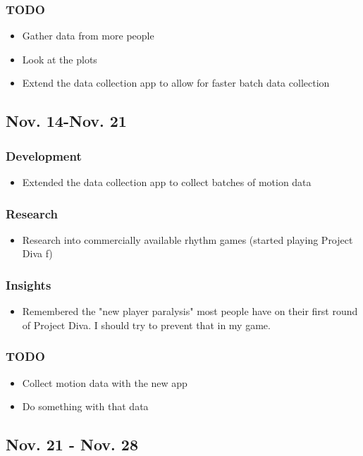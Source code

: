 \documentclass{article}
\begin{document}
\subsubsection{TODO}
\begin{itemize}
    \item Gather data from more people
    \item Look at the plots
    \item Extend the data collection app to allow for faster batch data collection
\end{itemize}
\subsection{Nov. 14-Nov. 21}
\subsubsection{Development}
\begin{itemize}
    \item Extended the data collection app to collect batches of motion data
\end{itemize}
\subsubsection{Research}
\begin{itemize}
    \item Research into commercially available rhythm games (started playing Project Diva f)
\end{itemize}
\subsubsection{Insights}
\begin{itemize}
    \item Remembered the "new player paralysis" most people have on their first round of Project Diva. I should try to prevent that in my game.
\end{itemize}
\subsubsection{TODO}
\begin{itemize}
    \item Collect motion data with the new app
    \item Do something with that data
\end{itemize}
\subsection{Nov. 21 - Nov. 28}
\end{document}
